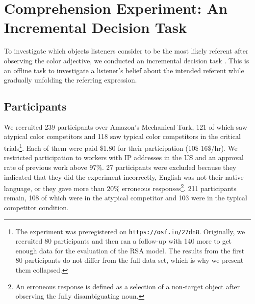 \documentclass[10pt,letterpaper]{article}
\begin{document}
\section{Comprehension Experiment: An Incremental Decision Task}
To investigate which objects listeners consider to be the most likely referent after observing the color adjective, we conducted an incremental decision task \cite{Qing:2018}. This is an offline task to investigate a listener's belief about the intended referent while gradually unfolding the referring expression.


\subsection{Participants}
We recruited 239 participants over Amazon's Mechanical Turk, 121 of which saw atypical color competitors and 118 saw typical color competitors in the critical trials\footnote{The experiment was preregistered on \texttt{https://osf.io/27dn8}. Originally, we recruited 80 participants and then ran a follow-up with 140 more to get enough data for the evaluation of the RSA model. The results from the first 80 participants do not differ from the full data set, which is why we present them collapsed.}. Each of them were paid \$1.80 for their participation (10\$-16\$/hr). We restricted participation to workers with IP addresses in the US and an approval rate of previous work above 97\%. 
27 participants were excluded because they indicated that they did the experiment incorrectly, English was not their native language, or they gave more than 20\% erroneous responses\footnote{An erroneous response is defined as a selection of a non-target object after observing the fully disambiguating noun.}. 211 participants remain, 108 of which were in the atypical competitor and 103 were in the typical competitor condition. 

\end{document}
